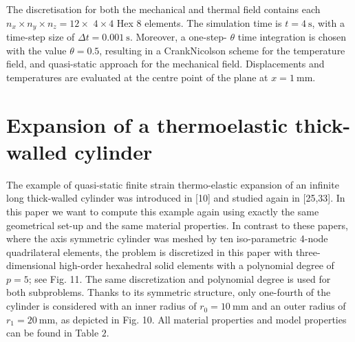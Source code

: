The discretisation for both the mechanical and thermal field contains each \(n_{x} \times n_{y} \times n_{z}=12 \times\) \(4 \times 4\) Hex 8 elements.
The simulation time is \(t=\SI{4}{\second}\), with a time-step size of \(\Delta t=\SI{0.001}{\second}\).
Moreover, a one-step- \(\theta\) time integration is chosen with the value \(\theta=0.5\), resulting in a CrankNicolson scheme for the temperature field, and quasi-static approach for the mechanical field.
Displacements and temperatures are evaluated at the centre point of the plane at \(x=\SI{1}{\milli\meter}\).

\section{Expansion of a thermoelastic thick-walled cylinder}

The example of quasi-static finite strain thermo-elastic expansion of an infinite long thick-walled cylinder was introduced in [10] and studied again in [25,33].
In this paper we want to compute this example again using exactly the same geometrical set-up and the same material properties.
In contrast to these papers, where the axis symmetric cylinder was meshed by ten iso-parametric 4-node quadrilateral elements, the problem is discretized in this paper with three-dimensional high-order hexahedral solid elements with a polynomial degree of \(p=5\); see Fig. 11. 
The same discretization and polynomial degree is used for both subproblems. Thanks to its symmetric structure, only one-fourth of the cylinder is considered with an inner radius of \(r_{0}=10 \mathrm{~mm}\) and an outer radius of \(r_{1}=20 \mathrm{~mm}\), as depicted in Fig. 10.
All material properties and model properties can be found in Table \(2\).

